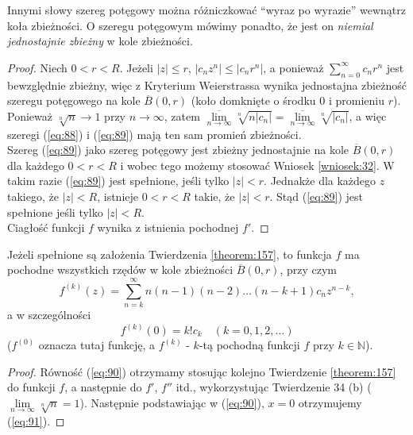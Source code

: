 \documentclass[leqno]{article}
\begin{document}
\begin{justify}
\begin{theorem}
Innymi słowy szereg potęgowy można różniczkować ``wyraz po wyrazie'' wewnątrz koła zbieżności. O szeregu potęgowym
mówimy ponadto, że jest on \emph{niemial jednostajnie zbieżny} w kole zbieżności. 
\end{theorem}

\begin{proof}
    Niech $0 < r < R$. Jeżeli $|z| \leqslant r$, $|c_n z^n| \leqslant |c_n r^n|$, a ponieważ $\sum\limits_{n=0}^{\infty}c_n r^n$ jest
    bewzględnie zbieżny, więc z Kryterium Weierstrassa wynika jednostajna zbieżność szeregu potęgowego na kole $\overline{B}(0, r)$ 
    (koło domknięte o środku $0$ i promieniu $r$). \\
    Ponieważ $\sqrt[n]{n} \to 1$ przy $n \to \infty$, zatem $\overline{\lim\limits_{n \to \infty}} \sqrt[n]{n |c_n|} = \overline{\lim\limits_{n \to \infty}}\sqrt[n]{|c_n|}$,
    a więc szeregi (\ref{eq:88}) i (\ref{eq:89}) mają ten sam promień zbieżności.  \\
    Szereg (\ref{eq:89}) jako szereg potęgowy jest zbieżny jednostajnie na kole $\overline{B}(0, r)$ dla każdego $0 < r < R$ i wobec tego możemy stosować Wniosek \ref{wniosek:32}.
    W takim razie (\ref{eq:89}) jest spełnione, jeśli tylko $|z| < r$. Jednakże dla każdego $z$ takiego, że $|z| < R$, istnieje $0 < r < R$ takie, że 
    $|z| < r$. Stąd (\ref{eq:89}) jest spełnione jeśli tylko $|z| < R$. \\
    Ciagłość funkcji $f$ wynika z istnienia pochodnej $f'$. 
\end{proof}

\begin{wniosek}
{
    Jeżeli spełnione są założenia Twierdzenia \ref{theorem:157}, to funkcja $f$ ma pochodne wszystkich rzędów w kole zbieżności $\overline{B}(0, r)$, przy czym 
    \begin{equation}\label{eq:90}
        f^{(k)}(z) = \sum_{n=k}^{\infty}n(n-1)(n-2)\ldots(n-k + 1)c_n z^{n - k},
    \end{equation}
    a w szczególności
    \begin{equation}\label{eq:91}
        f^{(k)}(0) = k!c_k \quad (k = 0, 1, 2, \ldots)
    \end{equation}
    ($f^{(0)}$ oznacza tutaj funkcję, a $f^{(k)}$ - $k$-tą pochodną funkcji $f$ przy $k \in \mathbb{N}$).
}
\end{wniosek}

\begin{proof}
    Równość (\ref{eq:90}) otrzymamy stosując kolejno Twierdzenie \ref{theorem:157} do funkcji $f$, a następnie do $f'$, $f''$ itd.,
    wykorzystując Twierdzenie 34 (b) ($\lim\limits_{n \to \infty}\sqrt[n]{n} = 1$). Następnie podstawiając w (\ref{eq:90}), $x = 0$ otrzymujemy (\ref{eq:91}).
\end{proof}


\end{justify}
\end{document}
